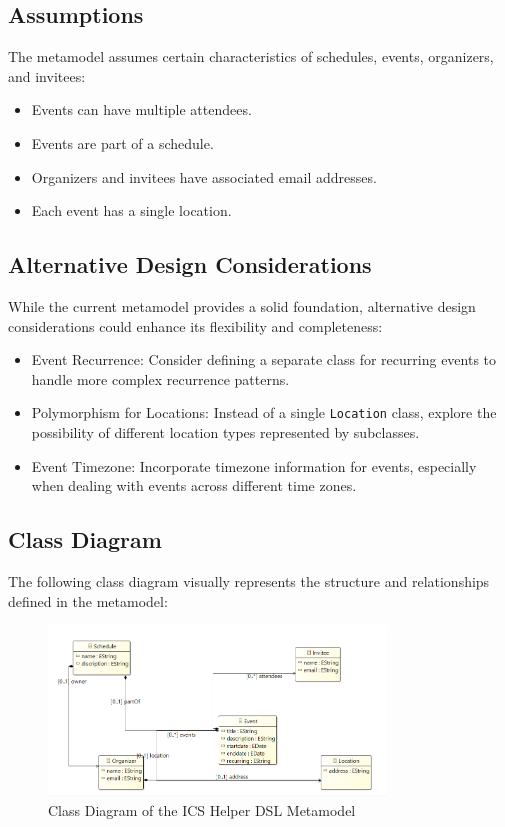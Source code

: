 \documentclass[12pt, letterpaper, twoside]{article}
\begin{document}
\subsection{Assumptions}

The metamodel assumes certain characteristics of schedules, events, organizers, and invitees:

\begin{itemize}
    \item Events can have multiple attendees.
    \item Events are part of a schedule.
    \item Organizers and invitees have associated email addresses.
    \item Each event has a single location.
\end{itemize}

\subsection{Alternative Design Considerations}

While the current metamodel provides a solid foundation, alternative design considerations could enhance its flexibility and completeness:

\begin{itemize}
    \item Event Recurrence: Consider defining a separate class for recurring events to handle more complex recurrence patterns.
    \item Polymorphism for Locations: Instead of a single \texttt{Location} class, explore the possibility of different location types represented by subclasses.
    \item Event Timezone: Incorporate timezone information for events, especially when dealing with events across different time zones.
\end{itemize}

\subsection{Class Diagram}

The following class diagram visually represents the structure and relationships defined in the metamodel:

\begin{figure}[H]
    \centering
    \includegraphics[width=0.8\textwidth]{class.png}
    \caption{Class Diagram of the ICS Helper DSL Metamodel}
    \label{fig:class-diagram}
\end{figure}
\end{document}
